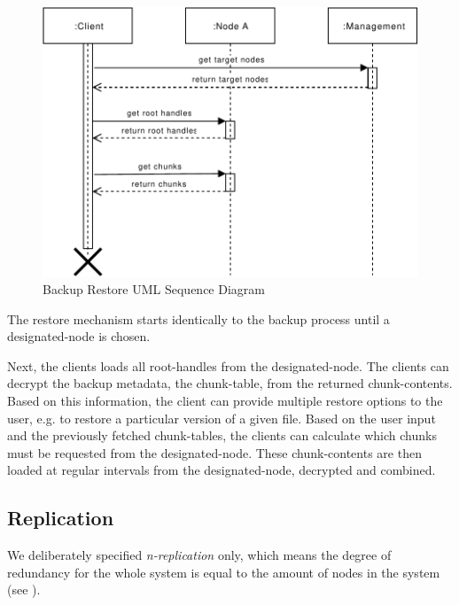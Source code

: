 \begin{figure}[h]
    \centering
    \includegraphics[width=\linewidth]{resources/backup_restore.pdf}
    \caption{Backup Restore UML Sequence Diagram}
\end{figure}

The restore mechanism starts identically to the backup process until a \gls{designated-node} is chosen.

Next, the \glspl{client} loads all \glspl{root-handle} from the \gls{designated-node}. The \glspl{client} can decrypt the backup metadata, the \gls{chunk-table}, from the returned \glspl{chunk-content}. Based on this information, the \gls{client} can provide multiple restore options to the \gls{user}, e.g. to restore a particular version of a given file.
Based on the user input and the previously fetched \glspl{chunk-table}, the \glspl{client} can calculate which \glspl{chunk} must be requested from the \gls{designated-node}. These \glspl{chunk-content} are then loaded at regular intervals from the \gls{designated-node}, decrypted and combined.

\subsection{Replication}\label{sec:replication}
We deliberately specified \emph{n-replication} only, which means the degree of redundancy for the whole system is equal to the amount of \glspl{node} in the system (see ).

